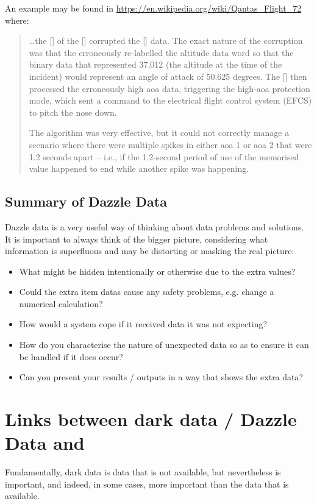 An example may be found in
\href{https://en.wikipedia.org/wiki/Qantas\_Flight\_72}{https://en.wikipedia.org/wiki/Qantas\_Flight\_72}
where:
\begin{quotation}
  \dots the [] of the  [] corrupted the  [] data. The exact nature of the corruption was that the   erroneously re-labelled the altitude data word so that the binary data that represented 37,012 (the altitude at the time of the incident) would represent an angle of attack of 50.625 degrees. The  [] then processed the erroneously high \gls{aoa} data, triggering the high-\gls{aoa} protection mode, which sent a command to the electrical flight control system (EFCS) to pitch the nose down.
  
  The  algorithm was very effective, but it could not correctly manage a scenario where there were multiple spikes in either \gls{aoa} 1 or \gls{aoa} 2 that were 1.2 seconds apart -- i.e., if the 1.2-second period of use of the memorised value happened to end while another spike was happening.
  \end{quotation}
\subsection{Summary of Dazzle Data}
Dazzle data is a very useful way of thinking about data problems and solutions.
It is important to always think of the bigger picture,
considering what \gls{information} is superfluous and may be distorting or masking the real picture:
\begin{itemize}
    \item What might be hidden intentionally or otherwise due to the extra values?
    \item Could the extra \glspl{item data} cause any safety problems, e.g. change a numerical calculation?
    \item How would a system cope if it received data it was not expecting?
    \item How do you characterise the nature of unexpected data so as to ensure it can be handled if it does occur?
    \item Can you present your results / outputs in a way that shows the extra data?
\end{itemize}
%
%
\section{Links between dark data / Dazzle Data and }
Fundamentally, dark data is data that is not available, but nevertheless is important, and indeed, in some cases, more important than the data that is available.


